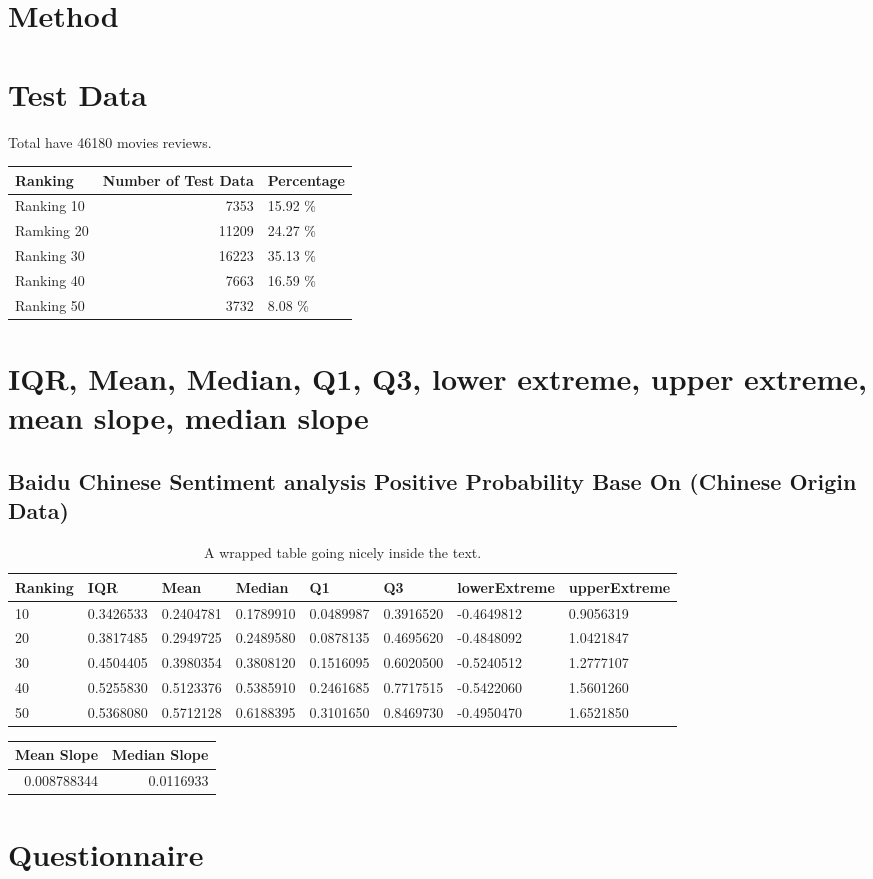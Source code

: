 \documentclass[conference]{IEEEtran}
\begin{document}
\section{Method}
\section{Test Data}
Total have 46180 movies reviews.
\begin{tabular}{lrl}
Ranking & Number of Test Data & Percentage\\
\hline
Ranking 10 & 7353 & 15.92 \%\\
Ramking 20 & 11209 & 24.27 \%\\
Ranking 30 & 16223 & 35.13 \%\\
Ranking 40 & 7663 & 16.59 \%\\
Ranking 50 & 3732 & 8.08 \%\\
\end{tabular}

\section{IQR, Mean, Median, Q1, Q3, lower extreme, upper extreme, mean slope, median slope}
\subsection{Baidu Chinese Sentiment analysis Positive Probability Base On
  (Chinese Origin Data)}
\begin{wraptable}{r}{0.5\textwidth}
\caption{A wrapped table going nicely inside the text.}\label{wrap-tab:1}
\begin{tabularx}{\textwidth}{ |X|X|X|X|X|X|X|X }
Ranking & IQR & Mean & Median & Q1 & Q3 & lowerExtreme & upperExtreme\\
\hline
10 & 0.3426533 & 0.2404781 & 0.1789910 & 0.0489987 & 0.3916520 & -0.4649812 & 0.9056319\\
20 & 0.3817485 & 0.2949725 & 0.2489580 & 0.0878135 & 0.4695620 & -0.4848092 & 1.0421847\\
30 & 0.4504405 & 0.3980354 & 0.3808120 & 0.1516095 & 0.6020500 & -0.5240512 & 1.2777107\\
40 & 0.5255830 & 0.5123376 & 0.5385910 & 0.2461685 & 0.7717515 & -0.5422060 & 1.5601260\\
50 & 0.5368080 & 0.5712128 & 0.6188395 & 0.3101650 & 0.8469730 & -0.4950470 & 1.6521850\\
\end{tabularx}
\end{wraptable}

\begin{tabular}{rr}
  \hline
  Mean Slope & Median Slope \\
  \hline
  0.008788344 & 0.0116933 \\
  \hline
\end{tabular}
\section{Questionnaire}




\end{document}
